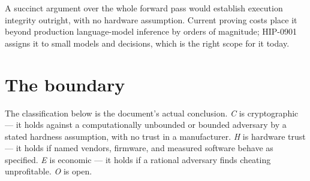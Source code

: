 \documentclass[11pt]{article}
\begin{document}
A succinct argument over the whole forward pass would establish execution integrity outright, with
no hardware assumption. Current proving costs place it beyond production language-model inference by
orders of magnitude; HIP-0901 assigns it to small models and decisions, which is the right scope for
it today.

\section{The boundary}
\label{sec:boundary}

The classification below is the document's actual conclusion. \emph{C} is cryptographic --- it holds
against a computationally unbounded or bounded adversary by a stated hardness assumption, with no
trust in a manufacturer. \emph{H} is hardware trust --- it holds if named vendors, firmware, and
measured software behave as specified. \emph{E} is economic --- it holds if a rational adversary
finds cheating unprofitable. \emph{O} is open.
\end{document}
